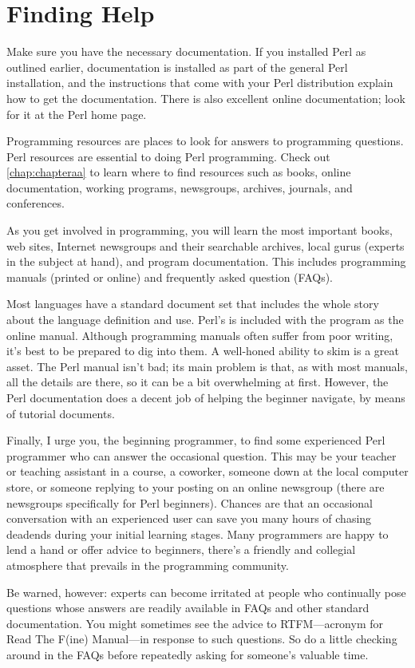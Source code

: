 \section{Finding Help}
Make sure you have the necessary documentation. If you installed Perl as outlined earlier, documentation is installed as part of the general Perl installation, and the instructions that come with your Perl distribution explain how to get the documentation. There is also excellent online documentation; look for it at the Perl home page.

Programming resources are places to look for answers to programming questions. Perl resources are essential to doing Perl programming. Check out \autoref{chap:chapteraa} to learn where to find resources such as books, online documentation, working programs, newsgroups, archives, journals, and conferences.

As you get involved in programming, you will learn the most important books, web sites, Internet newsgroups and their searchable archives, local gurus (experts in the subject at hand), and program documentation. This includes programming manuals (printed or online) and frequently asked question (FAQs).

Most languages have a standard document set that includes the whole story about the language definition and use. Perl's is included with the program as the online manual. Although programming manuals often suffer from poor writing, it's best to be prepared to dig into them. A well-honed ability to skim is a great asset. The Perl manual isn't bad; its main problem is that, as with most manuals, all the details are there, so it can be a bit overwhelming at first. However, the Perl documentation does a decent job of helping the beginner navigate, by means of tutorial documents.

Finally, I urge you, the beginning programmer, to find some experienced Perl programmer who can answer the occasional question. This may be your teacher or teaching assistant in a course, a coworker, someone down at the local computer store, or someone replying to your posting on an online newsgroup (there are newsgroups specifically for Perl beginners). Chances are that an occasional conversation with an experienced user can save you many hours of chasing deadends during your initial learning stages. Many programmers are happy to lend a hand or offer advice to beginners, there's a friendly and collegial atmosphere that prevails in the programming community.

Be warned, however: experts can become irritated at people who continually pose questions whose answers are readily available in FAQs and other standard documentation. You might sometimes see the advice to RTFM—acronym for Read The F(ine) Manual—in response to such questions. So do a little checking around in the FAQs before repeatedly asking for someone's valuable time.

